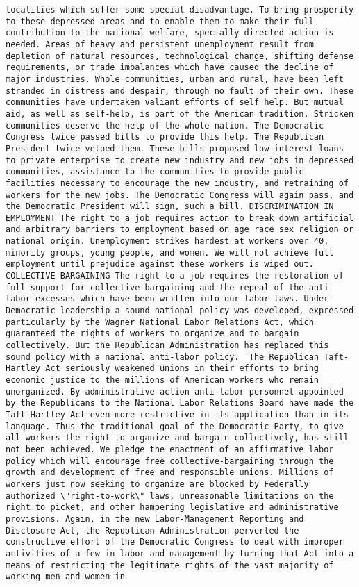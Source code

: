 \documentclass[
]{article}
\begin{document}
\begin{verbatim}
localities which suffer some special disadvantage. To bring prosperity to these depressed areas and to enable them to make their full contribution to the national welfare, specially directed action is needed. Areas of heavy and persistent unemployment result from depletion of natural resources, technological change, shifting defense requirements, or trade imbalances which have caused the decline of major industries. Whole communities, urban and rural, have been left stranded in distress and despair, through no fault of their own. These communities have undertaken valiant efforts of self help. But mutual aid, as well as self-help, is part of the American tradition. Stricken communities deserve the help of the whole nation. The Democratic Congress twice passed bills to provide this help. The Republican President twice vetoed them. These bills proposed low-interest loans to private enterprise to create new industry and new jobs in depressed communities, assistance to the communities to provide public facilities necessary to encourage the new industry, and retraining of workers for the new jobs. The Democratic Congress will again pass, and the Democratic President will sign, such a bill. DISCRIMINATION IN EMPLOYMENT The right to a job requires action to break down artificial and arbitrary barriers to employment based on age race sex religion or national origin. Unemployment strikes hardest at workers over 40, minority groups, young people, and women. We will not achieve full employment until prejudice against these workers is wiped out. COLLECTIVE BARGAINING The right to a job requires the restoration of full support for collective-bargaining and the repeal of the anti-labor excesses which have been written into our labor laws. Under Democratic leadership a sound national policy was developed, expressed particularly by the Wagner National Labor Relations Act, which guaranteed the rights of workers to organize and to bargain collectively. But the Republican Administration has replaced this sound policy with a national anti-labor policy.  The Republican Taft-Hartley Act seriously weakened unions in their efforts to bring economic justice to the millions of American workers who remain unorganized. By administrative action anti-labor personnel appointed by the Republicans to the National Labor Relations Board have made the Taft-Hartley Act even more restrictive in its application than in its language. Thus the traditional goal of the Democratic Party, to give all workers the right to organize and bargain collectively, has still not been achieved. We pledge the enactment of an affirmative labor policy which will encourage free collective-bargaining through the growth and development of free and responsible unions. Millions of workers just now seeking to organize are blocked by Federally authorized \"right-to-work\" laws, unreasonable limitations on the right to picket, and other hampering legislative and administrative provisions. Again, in the new Labor-Management Reporting and Disclosure Act, the Republican Administration perverted the constructive effort of the Democratic Congress to deal with improper activities of a few in labor and management by turning that Act into a means of restricting the legitimate rights of the vast majority of working men and women in 
\end{verbatim}
\end{document}
